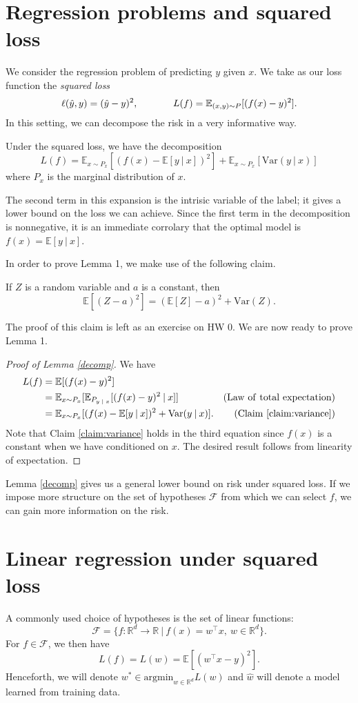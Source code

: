 \documentclass[]{subook}
\newcommand\E{\mathbb{E}}
\newcommand\Var{\mathrm{Var}}
\begin{document}
\section{Regression problems and squared loss}
We consider the regression problem of predicting $y$ given $x$. We take as our loss function the \textit{squared loss} $$\ell(\hat{y},y) = (\hat{y}-y)^2, \hspace{.5in} L(f) = \E_{(x,y)\sim P}[(f(x)-y)^2].$$ In this setting, we can decompose the risk in a very informative way.
\begin{lemma} \label{decomp}
Under the squared loss, we have the decomposition $$L(f) = \E_{x\sim P_x} [(f(x)-\E[y \: | \: x])^2] + \E_{x\sim P_x}[\Var(y\: | \:x)]$$ where $P_x$ is the marginal distribution of $x$.
\end{lemma}
The second term in this expansion is the intrisic variable of the label; it gives a lower bound on the loss we can achieve. Since the first term in the decomposition is nonnegative, it is an immediate corrolary that the optimal model is $f(x) = \E[y \: | \: x]$.

In order to prove Lemma 1, we make use of the following claim.
\begin{center}
    If $Z$ is a random variable and $a$ is a constant, then $$\E[(Z-a)^2] = (\E[Z]-a)^2 + \Var(Z).$$
\end{center}


The proof of this claim is left as an exercise on HW 0. We are now ready to prove Lemma 1.
\begin{proof}[Proof of Lemma \ref{decomp}]
We have
\begin{align*}
    L(f) &= \E[(f(x)-y)^2] \\
    &= \E_{x\sim P_x}[\E_{P_{y \; | \;x}}[(f(x)-y)^2\: | \: x]] & \mathrm{(Law~{} of~{} total~{} expectation)} \\
    &= \E_{x\sim P_x}[(f(x)-\E[y \: | \: x])^2 + \Var(y \: | \: x)]. & \mathrm{(Claim~{} \ref{claim:variance})}
\end{align*}
Note that Claim \ref{claim:variance} holds in the third equation since $f(x)$ is a constant when we have conditioned on $x$. The desired result follows from linearity of expectation.
\end{proof}
Lemma \ref{decomp} gives us a general lower bound on risk under squared loss. If we impose more structure on the set of hypotheses $\mathcal{F}$ from which we can select $f$, we can gain more information on the risk.

\section{Linear regression under squared loss}
A commonly used choice of hypotheses is the set of linear functions: $$\mathcal{F} = \{f: \mathbb{R}^d \rightarrow \mathbb{R} \: | \: f(x) = w^\top x, \: w\in \mathbb{R}^d\}.$$ For $f\in\mathcal{F}$, we then have $$L(f) = L(w) = \E[(w^\top x-y)^2].$$ Henceforth, we will denote $w^* \in \mathrm{argmin}_{w\in\mathbb{R}^d} L(w)$ and $\hat{w}$ will denote a model learned from training data.
\end{document}
